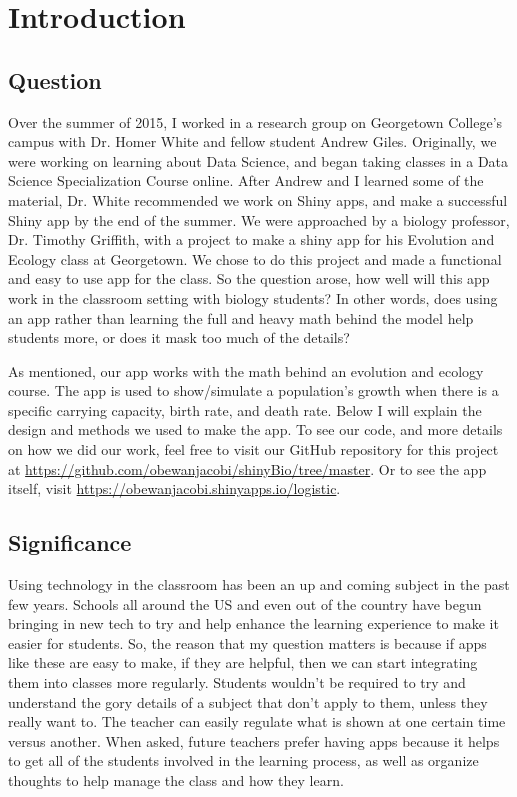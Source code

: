\documentclass[titlepage]{article}\usepackage[]{graphicx}\usepackage[]{color}
\begin{document}
\section{Introduction}

\subsection{Question}

Over the summer of 2015, I worked in a research group on Georgetown College's campus with Dr. Homer White and fellow student Andrew Giles. Originally, we were working on learning about Data Science, and began taking classes in a Data Science Specialization Course online. After Andrew and I learned some of the material, Dr. White recommended we work on Shiny apps, and make a successful Shiny app by the end of the summer. We were approached by a biology professor, Dr. Timothy Griffith, with a project to make a shiny app for his Evolution and Ecology class at Georgetown. We chose to do this project and made a functional and easy to use app for the class. So the question arose, how well will this app work in the classroom setting with biology students? In other words, does using an app rather than learning the full and heavy math behind the model help students more, or does it mask too much of the details?

As mentioned, our app works with the math behind an evolution and ecology course. The app is used to show/simulate a population's growth when there is a specific carrying capacity, birth rate, and death rate. Below I will explain the design and methods we used to make the app. To see our code, and more details on how we did our work, feel free to visit our GitHub repository for this project at \url{https://github.com/obewanjacobi/shinyBio/tree/master}. Or to see the app itself, visit \url{https://obewanjacobi.shinyapps.io/logistic}.

\subsection{Significance}

Using technology in the classroom has been an up and coming subject in the past few years. Schools all around the US and even out of the country have begun bringing in new tech to try and help enhance the learning experience to make it easier for students. So, the reason that my question matters is because if apps like these are easy to make, if they are helpful, then we can start integrating them into classes more regularly. Students wouldn't be required to try and understand the gory details of a subject that don't apply to them, unless they really want to. The teacher can easily regulate what is shown at one certain time versus another. When asked, future teachers prefer having apps because it helps to get all of the students involved in the learning process, as well as organize thoughts to help manage the class and how they learn.
\end{document}
